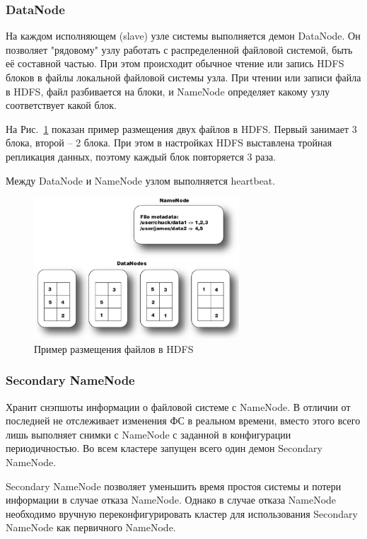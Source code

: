 \documentclass[a4paper,11pt]{article}
\begin{document}
\subsubsection{DataNode}
На каждом исполняющем (slave) узле системы выполняется демон DataNode. Он позволяет "рядовому" узлу работать с
распределенной файловой системой, быть её составной частью. При этом происходит обычное чтение или запись HDFS блоков
в файлы локальной файловой системы узла. При чтении или записи файла в HDFS, файл разбивается на блоки, и NameNode
определяет какому узлу соответствует какой блок.

На Рис.~\ref{fig:namenode_datanode} показан пример размещения двух файлов в HDFS. Первый занимает 3 блока, второй --
2 блока. При этом в настройках HDFS выставлена тройная репликация данных, поэтому каждый блок повторяется 3 раза.

Между DataNode и NameNode узлом выполняется heartbeat.

\begin{figure}[h!]
  \centering
  \includegraphics[height=200px]{res/namenode_datanode.png}
  \caption{Пример размещения файлов в HDFS}
  \label{fig:namenode_datanode}
\end{figure}

\subsubsection{Secondary NameNode}
Хранит снэпшоты информации о файловой системе с NameNode. В отличии от последней не отслеживает изменения ФС в реальном
времени, вместо этого всего лишь выполняет снимки с NameNode с заданной в конфигурации периодичностью. Во всем кластере
запущен всего один демон Secondary NameNode.

Secondary NameNode позволяет уменьшить время простоя системы и потери информации в случае отказа NameNode. Однако в
случае отказа NameNode необходимо вручную переконфигурировать кластер для использования Secondary NameNode как
первичного NameNode.
\end{document}
